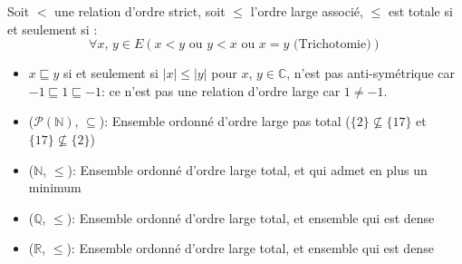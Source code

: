 \begin{lemma}

	Soit $<$ une relation d'ordre strict, soit $\leqslant$ l'ordre large associé, $\leqslant$ est totale si et seulement si :
	\begin{equation*}
		\forall x \text{, } y \in E (x < y \text{ ou } y < x \text{ ou } x = y \text{ (Trichotomie)})
	\end{equation*}

\end{lemma}

\begin{example}
	\begin{itemize}
		\item $x \sqsubseteq y$ si et seulement si $|x| \leqslant |y|$ pour $x$, $y \in \mathbb{C}$, n'est pas anti-symétrique
		      car $-1 \sqsubseteq 1 \sqsubseteq -1$: ce n'est pas une relation d'ordre large car $1 \neq -1$.
		\item ($\mathscr{P}(\mathbb{N})$, $\subseteq$): Ensemble ordonné d'ordre large pas total ($\{2\} \nsubseteq \{17\}$ et $\{17\} \nsubseteq \{2\}$)
		\item ($\mathbb{N}$, $\leqslant$): Ensemble ordonné d'ordre large total, et qui admet en plus un minimum
		\item ($\mathbb{Q}$, $\leqslant$): Ensemble ordonné d'ordre large total, et ensemble qui est dense
		\item ($\mathbb{R}$, $\leqslant$): Ensemble ordonné d'ordre large total, et ensemble qui est dense
	\end{itemize}
\end{example}
